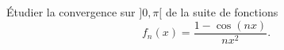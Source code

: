 

\begin{exercice}\label{exo118}

Étudier la convergence sur $]0,\pi[$ de la suite de fonctions
\begin{equation}
	f_n(x)= \frac{ 1- \cos(nx) }{ nx^2 }.
\end{equation}

\end{exercice}
